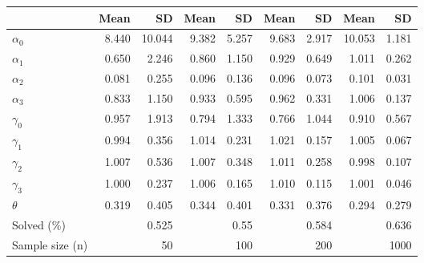 
\begin{tabular}[t]{lrrrrrrrr}
\toprule
  & Mean & SD & Mean  & SD  & Mean   & SD   & Mean    & SD   \\
\midrule
$\alpha_{0}$ & 8.440 & 10.044 & 9.382 & 5.257 & 9.683 & 2.917 & 10.053 & 1.181\\
$\alpha_{1}$ & 0.650 & 2.246 & 0.860 & 1.150 & 0.929 & 0.649 & 1.011 & 0.262\\
$\alpha_{2}$ & 0.081 & 0.255 & 0.096 & 0.136 & 0.096 & 0.073 & 0.101 & 0.031\\
$\alpha_{3}$ & 0.833 & 1.150 & 0.933 & 0.595 & 0.962 & 0.331 & 1.006 & 0.137\\
$\gamma_{0}$ & 0.957 & 1.913 & 0.794 & 1.333 & 0.766 & 1.044 & 0.910 & 0.567\\
$\gamma_{1}$ & 0.994 & 0.356 & 1.014 & 0.231 & 1.021 & 0.157 & 1.005 & 0.067\\
$\gamma_{2}$ & 1.007 & 0.536 & 1.007 & 0.348 & 1.011 & 0.258 & 0.998 & 0.107\\
$\gamma_{3}$ & 1.000 & 0.237 & 1.006 & 0.165 & 1.010 & 0.115 & 1.001 & 0.046\\
$\theta$ & 0.319 & 0.405 & 0.344 & 0.401 & 0.331 & 0.376 & 0.294 & 0.279\\
Solved (\%) &  & 0.525 &  & 0.55 &  & 0.584 &  & 0.636\\
Sample size (n) &  & 50 &  & 100 &  & 200 &  & 1000\\
\bottomrule
\end{tabular}
